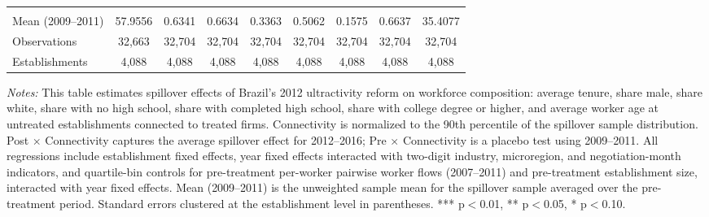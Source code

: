 \begin{table}[]
\begin{threeparttable}
{\begin{tabular}{lcccccccc}
  &  &  &  &  &  &  &  & \\
Mean (2009--2011) & 57.9556 & 0.6341 & 0.6634 & 0.3363 & 0.5062 & 0.1575 & 0.6637 & 35.4077 \\
Observations & 32{,}663 & 32{,}704 & 32{,}704 & 32{,}704 & 32{,}704 & 32{,}704 & 32{,}704 & 32{,}704 \\
Establishments & 4{,}088 & 4{,}088 & 4{,}088 & 4{,}088 & 4{,}088 & 4{,}088 & 4{,}088 & 4{,}088 \\
\bottomrule
\end{tabular}%
}
\scriptsize
\begin{tablenotes}
\item \textit{Notes:} This table estimates spillover effects of Brazil's 2012 ultractivity reform on workforce composition: average tenure, share male, share white, share with no high school, share with completed high school, share with college degree or higher, and average worker age at untreated establishments connected to treated firms. Connectivity is normalized to the 90th percentile of the spillover sample distribution. Post $\times$ Connectivity captures the average spillover effect for 2012--2016; Pre $\times$ Connectivity is a placebo test using 2009--2011. All regressions include establishment fixed effects, year fixed effects interacted with two-digit industry, microregion, and negotiation-month indicators, and quartile-bin controls for pre-treatment per-worker pairwise worker flows (2007--2011) and pre-treatment establishment size, interacted with year fixed effects. Mean (2009--2011) is the unweighted sample mean for the spillover sample averaged over the pre-treatment period. Standard errors clustered at the establishment level in parentheses. *** p$<$0.01, ** p$<$0.05, * p$<$0.10.
\end{tablenotes}
\end{threeparttable}
\end{table}

